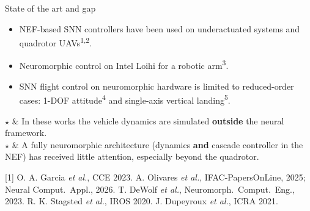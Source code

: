 \documentclass{beamer}
\newcommand{\slideref}[1]{\vfill{\tiny #1}}
\begin{document}
\begin{frame}{State of the art and gap}
\footnotesize
\begin{itemize}
    \item NEF-based SNN controllers have been used on underactuated systems and quadrotor UAVs\textsuperscript{1,2}.
    \item Neuromorphic control on Intel Loihi for a robotic arm\textsuperscript{3}.
    \item SNN flight control on neuromorphic hardware is limited to reduced-order cases: 1-DOF attitude\textsuperscript{4} and single-axis vertical landing\textsuperscript{5}.
\end{itemize}

\begin{table}[h]
    \centering
    \begin{tcolorbox}[
        tabularx = {l | X},
        title = Gap:,
        colback = primaryblue!8,
        colframe = primaryblue,
        fontupper=\footnotesize
    ]
        $\star$ & In these works the vehicle dynamics are simulated \textbf{outside} the neural framework.\\
        $\star$ & A fully neuromorphic architecture (dynamics \textbf{and} cascade controller in the NEF) has received little attention, especially beyond the quadrotor.\\
    \end{tcolorbox}
\end{table}

\slideref{[1] O. A. Garcia \emph{et al.}, CCE 2023. \quad [2] A. Olivares \emph{et al.}, IFAC-PapersOnLine, 2025; Neural Comput.\ Appl., 2026. \quad [3] T. DeWolf \emph{et al.}, Neuromorph.\ Comput.\ Eng., 2023. \quad [4] R. K. Stagsted \emph{et al.}, IROS 2020. \quad [5] J. Dupeyroux \emph{et al.}, ICRA 2021.}
\end{frame}

\end{document}
